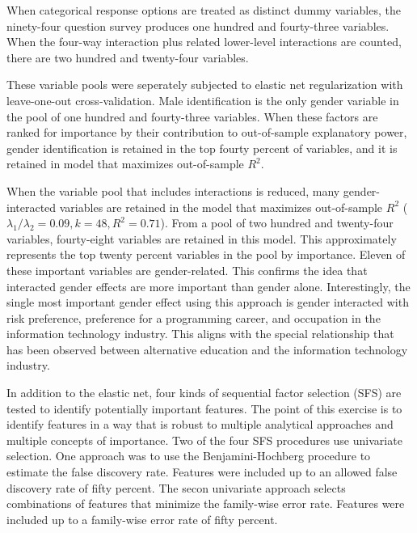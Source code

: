 \documentclass[review]{elsarticle}
\begin{document}

When categorical response options are treated as distinct dummy variables,
the ninety-four question survey produces one hundred and fourty-three variables.
When the four-way interaction plus related lower-level interactions are counted,
there are two hundred and twenty-four variables.

These variable pools were seperately subjected to elastic net regularization with leave-one-out cross-validation.
Male identification is the only gender variable in the pool of one hundred and fourty-three variables.
When these factors are ranked for importance by their contribution to out-of-sample explanatory power,
gender identification is retained in the top fourty percent of variables, and it is retained in model that maximizes out-of-sample $R^2$.

When the variable pool that includes interactions is reduced, many gender-interacted variables
are retained in the model that maximizes out-of-sample $R^2$ ($ \lambda_1 / \lambda_2 = 0.09, k = 48, R^2=0.71 $).
From a pool of two hundred and twenty-four variables, fourty-eight variables are retained in this model.
This approximately represents the top twenty percent variables in the pool by importance.
Eleven of these important variables are gender-related.
This confirms the idea that interacted gender effects are more important than gender alone.
Interestingly, the single most important gender effect using this approach is
gender interacted with risk preference,
preference for a programming career,
and occupation in the information technology industry.
This aligns with the special relationship that has been observed between alternative education and the information technology industry.

In addition to the elastic net, four kinds of sequential factor selection (SFS) are tested to identify potentially important features.
The point of this exercise is to identify features in a way that is robust to multiple analytical approaches and multiple concepts of importance.
Two of the four SFS procedures use univariate selection.
One approach was to use the Benjamini-Hochberg procedure to estimate the false discovery rate.
Features were included up to an allowed false discovery rate of fifty percent.
The secon univariate approach selects combinations of features that minimize the family-wise error rate.
Features were included up to a family-wise error rate of fifty percent.
\end{document}
